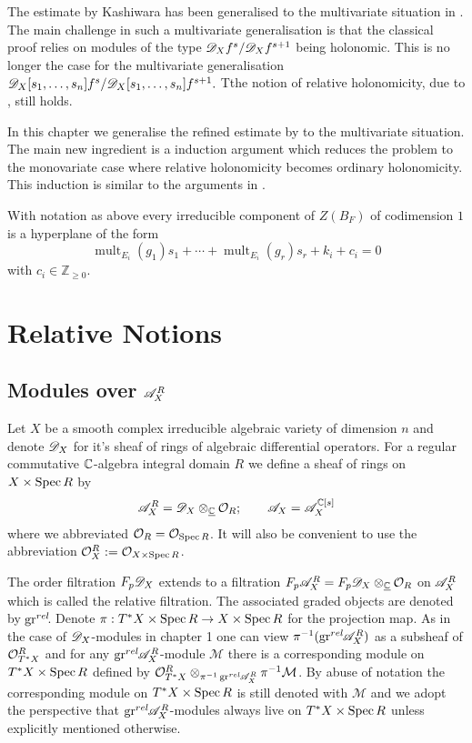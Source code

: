 The estimate by Kashiwara has been generalised to the multivariate situation in \cite{budur2020zero}.
The main challenge in such a multivariate generalisation is that the classical proof relies on modules of the type $\mathscr{D}_X f^{s}/ \mathscr{D}_X f^{s+1}$ being holonomic.
This is no longer the case for the multivariate generalisation $\mathscr{D}_X[s_1,\ldots, s_n]f^s /\mathscr{D}_X[s_1,\ldots, s_n]f^{s+1}.$
Tthe notion of relative holonomicity, due to \cite{maisonobe2016filtration}, still holds.

In this chapter we generalise the refined estimate by \cite{lichtin1989poles} to the multivariate situation.
The main new ingredient is a induction argument which reduces the problem to the monovariate case where relative holonomicity becomes ordinary holonomicity.
This induction is similar to the arguments in \cite{budur2019zero}.
\begin{theorem}\label{thm: EstimateBernsteinSatoZeroLocust}
  With notation as above every irreducible component of $Z(B_F)$ of codimension $1$ is a hyperplane of the form
  $$\operatorname{mult}_{E_i}(g_1) s_1 + \cdots + \operatorname{mult}_{E_i}(g_r)s_r + k_i + c_i=0$$
  with $c_i \in \mathbb{Z}_{\geq 0 }$.
\end{theorem}
\section{Relative Notions}
\subsection{Modules over $\mathscr{A}_X^R$}
Let $X$ be a smooth complex irreducible algebraic variety of dimension $n$ and denote $\mathscr{D}_X$ for it's sheaf of rings of algebraic differential operators.
For a regular commutative $\mathbb{C}$-algebra integral domain $R$ we define a sheaf of rings on $X\times \operatorname{Spec} R$ by
$$\mathscr{A}_{X}^R = \mathscr{D}_X \otimes_{\underline{\mathbb{C}}} \mathcal{O}_{R}; \qquad \mathscr{A}_X = \mathscr{A}_{X}^{\mathbb{C}[s]}$$
where we abbreviated $\mathcal{O}_R = \mathcal{O}_{\operatorname{Spec} R}$. It will also be convenient to use the abbreviation $\mathcal{O}_{X}^R := \mathcal{O}_{X \times \operatorname{Spec} R}$.


The order filtration $F_p\mathscr{D}_X$ extends to a filtration $F_p\mathscr{A}^R_X = F_p\mathscr{D}_X \otimes_{\underline{\mathbb{C}}} \mathcal{O}_R$ on $\mathscr{A}^R_X$ which is called the relative filtration.
The associated graded objects are denoted by $\operatorname{gr}^{rel}\mkern-5mu$. Denote $\pi:T^*X\times \operatorname{Spec} R \to X\times \operatorname{Spec} R$ for the projection map.
As in the case of $\mathscr{D}_X$-modules in chapter 1  one can view $\pi^{-1}(\operatorname{gr}^{rel}\mkern-5mu\mathscr{A}_X^R)$ as a subsheaf of $\mathcal{O}_{T^*X}^R$ and for any $\operatorname{gr}^{rel}\mkern-5mu\mathscr{A}_X^R$-module $\mathcal{M}$ there is a corresponding module on $T^*X\times \operatorname{Spec} R$ defined by $\mathcal{O}_{T^*X}^R\otimes_{\pi^{-1}\operatorname{gr}^{rel}\mkern-5mu\mathscr{A}_X^R}\pi^{-1}\mathcal{M}$.
By abuse of notation the corresponding module on $T^*X\times \operatorname{Spec} R$ is still denoted with $\mathcal{M}$ and we adopt the perspective that $\operatorname{gr}^{rel}\mkern-5mu\mathscr{A}_X^R$-modules always live on $T^*X\times \operatorname{Spec} R$ unless explicitly mentioned otherwise.


